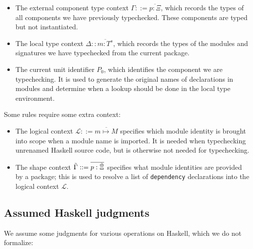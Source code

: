 \begin{itemize}
    \item The external component type context $\Gamma ::= \overline{p : \Xi}$,
        which records the types of all components we have previously
        typechecked.  These components are typed but not instantiated.
    \item The local type context $\Delta :: \overline{m : T^s}$,
        which records the types of the modules and signatures we have typechecked
        from the current package.
    \item The current unit identifier $P_0$, which identifies the component
        we are typechecking. It is used to generate the original names
        of declarations in modules and determine when a lookup should be
        done in the local type environment.
\end{itemize}
Some rules require some extra context:

\begin{itemize}
    \item The logical context $\mathcal{L} ::= \overline{m \mapsto M}$ specifies
        which module identity is brought into scope when a module name is imported.
        It is needed when typechecking unrenamed Haskell source code, but is
        otherwise not needed for typechecking.

    \item The shape context $\tilde{\Gamma} ::= \overline{p : {\tilde{\Xi}}}$ specifies what
        module identities are provided by a package; this is used to resolve
        a list of \texttt{dependency} declarations into the logical context $\mathcal{L}$.
\end{itemize}

\subsection{Assumed Haskell judgments}
\label{sec:typing-haskell}



We assume some judgments for various operations on
Haskell, which we do not formalize:

